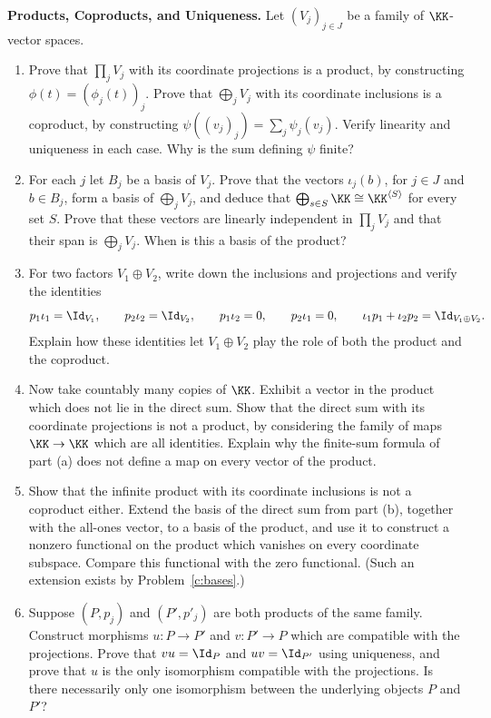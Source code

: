 \documentclass[12pt,reqno]{amsart}
\begin{document}
\begin{problems}
\item\label{c:products} \textbf{Products, Coproducts, and Uniqueness.} Let $(V_j)_{j\in J}$ be a family of $\KK$-vector spaces.
\begin{enumerate}
\item Prove that $\prod_jV_j$ with its coordinate projections is a product, by constructing $\phi(t)=(\phi_j(t))_j$. Prove that $\bigoplus_jV_j$ with its coordinate inclusions is a coproduct, by constructing $\psi((v_j)_j)=\sum_j\psi_j(v_j)$. Verify linearity and uniqueness in each case. Why is the sum defining $\psi$ finite?
\item For each $j$ let $B_j$ be a basis of $V_j$. Prove that the vectors $\iota_j(b)$, for $j\in J$ and $b\in B_j$, form a basis of $\bigoplus_jV_j$, and deduce that $\bigoplus_{s\in S}\KK\cong\KK^{\langle S\rangle}$ for every set $S$. Prove that these vectors are linearly independent in $\prod_jV_j$ and that their span is $\bigoplus_jV_j$. When is this a basis of the product?
\item For two factors $V_1\oplus V_2$, write down the inclusions and projections and verify the identities
\[
p_1\iota_1=\Id_{V_1},\qquad p_2\iota_2=\Id_{V_2},\qquad p_1\iota_2=0,\qquad p_2\iota_1=0,\qquad \iota_1p_1+\iota_2p_2=\Id_{V_1\oplus V_2}.
\]
Explain how these identities let $V_1\oplus V_2$ play the role of both the product and the coproduct.
\item Now take countably many copies of $\KK$. Exhibit a vector in the product which does not lie in the direct sum. Show that the direct sum with its coordinate projections is not a product, by considering the family of maps $\KK\to\KK$ which are all identities. Explain why the finite-sum formula of part (a) does not define a map on every vector of the product.
\item Show that the infinite product with its coordinate inclusions is not a coproduct either. Extend the basis of the direct sum from part (b), together with the all-ones vector, to a basis of the product, and use it to construct a nonzero functional on the product which vanishes on every coordinate subspace. Compare this functional with the zero functional. (Such an extension exists by Problem~\ref{c:bases}.)
\item Suppose $(P,p_j)$ and $(P',p'_j)$ are both products of the same family. Construct morphisms $u:P\to P'$ and $v:P'\to P$ which are compatible with the projections. Prove that $vu=\Id_P$ and $uv=\Id_{P'}$ using uniqueness, and prove that $u$ is the only isomorphism compatible with the projections. Is there necessarily only one isomorphism between the underlying objects $P$ and $P'$?
\end{enumerate}
\end{problems}
\end{document}
